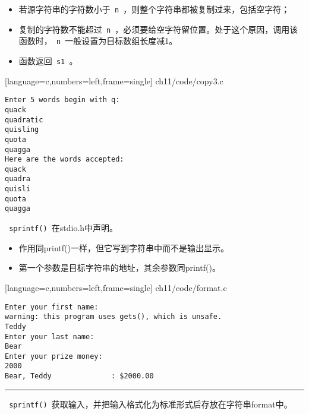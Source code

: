 \begin{frame}[fragile] 
\begin{itemize}
\item 
若源字符串的字符数小于\lstinline| n |，则整个字符串都被复制过来，包括空字符；
\item
复制的字符数不能超过\lstinline| n |，必须要给空字符留位置。处于这个原因，调用该函数时，\lstinline| n |一般设置为目标数组长度减1。
\item
函数返回\lstinline| s1 |。
\end{itemize}
\end{frame}


\begin{frame}

[language=c,numbers=left,frame=single]
{ch11/code/copy3.c}
\end{frame}


\begin{frame}[fragile]
\begin{lstlisting}[backgroundcolor=\color{blue!20}]
Enter 5 words begin with q:
quack
quadratic
quisling
quota
quagga
Here are the words accepted:
quack
quadra
quisli
quota
quagga
\end{lstlisting}
\end{frame}


\begin{frame}[fragile]
\lstinline| sprintf() |在{\tf stdio.h}中声明。 \vspace{.05in}

\begin{itemize}
\item 
作用同{\tf printf()}一样，但它写到字符串中而不是输出显示。 \\[0.1in]
\item
第一个参数是目标字符串的地址，其余参数同{\tf printf()}。
\end{itemize}
\end{frame}


\begin{frame}

[language=c,numbers=left,frame=single]
{ch11/code/format.c}
\end{frame}


\begin{frame}[fragile]
\begin{lstlisting}[backgroundcolor=\color{blue!20}]
Enter your first name:
warning: this program uses gets(), which is unsafe.
Teddy
Enter your last name:
Bear
Enter your prize money:
2000
Bear, Teddy              : $2000.00

\end{lstlisting}

\pause \rule{\textwidth}{0.3mm}\vspace{0.3mm}

\lstinline| sprintf() |获取输入，并把输入格式化为标准形式后存放在字符串{\tf format}中。

\end{frame}